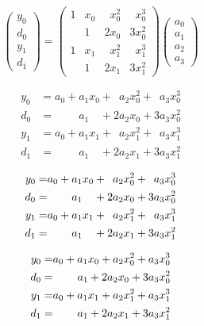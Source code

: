 \begin{equation}
\begin{pmatrix}
y_0 \\ d_0 \\ y_1 \\ d_1
\end{pmatrix}
=
\begin{pmatrix}
1 & x_0 & \phantom{2} x_0^2 & \phantom{3} x_0^3 \\
  & 1   & 2 x_0 & 3 x_0^2 \\
1 & x_1 & \phantom{2} x_1^2 & \phantom{3} x_1^3 \\
  & 1   & 2 x_1 & 3 x_1^2 
\end{pmatrix}
\begin{pmatrix}
a_0 \\ a_1 \\ a_2 \\ a_3
\end{pmatrix}
\end{equation}

\begin{align}
 y_0 & = a_0 + a_1 x_0 + \phantom{2} a_2 x_0^2 + \phantom{3} a_3 x_0^3 \\
 d_0 & = \phantom{a_0} \phantom{+} a_1 \phantom{x_0} + 2 a_2 x_0 + 3 a_3 x_0^2 \nonumber \\
 y_1 & = a_0 + a_1 x_1 + \phantom{2} a_2 x_1^2 + \phantom{3} a_3 x_1^3 \nonumber \\
 d_1 & = \phantom{a_0} \phantom{+} a_1 \phantom{x_0} + 2 a_2 x_1 + 3 a_3 x_1^2 \nonumber
\end{align}

\begin{align}
 y_0 = & {a_0 + a_1 x_0 + \phantom{2} a_2 x_0^2 + \phantom{3} a_3 x_0^3} \\
 d_0 = & \pushright{a_1 \phantom{x_0} + 2 a_2 x_0 + 3 a_3 x_0^2} \nonumber \\
 y_1 = & {a_0 + a_1 x_1 + \phantom{2} a_2 x_1^2 + \phantom{3} a_3 x_1^3 }\nonumber \\
 d_1 = & \pushright{a_1 \phantom{x_0} + 2 a_2 x_1 + 3 a_3 x_1^2} \nonumber
\end{align}

\begin{align}
 y_0 = & {a_0 + a_1 x_0 + a_2 x_0^2 + a_3 x_0^3} \\
 d_0 = & \pushright{a_1 + 2 a_2 x_0 + 3 a_3 x_0^2} \nonumber \\
 y_1 = & {a_0 + a_1 x_1 + a_2 x_1^2 + a_3 x_1^3 }\nonumber \\
 d_1 = & \pushright{a_1 + 2 a_2 x_1 + 3 a_3 x_1^2} \nonumber
\end{align}

